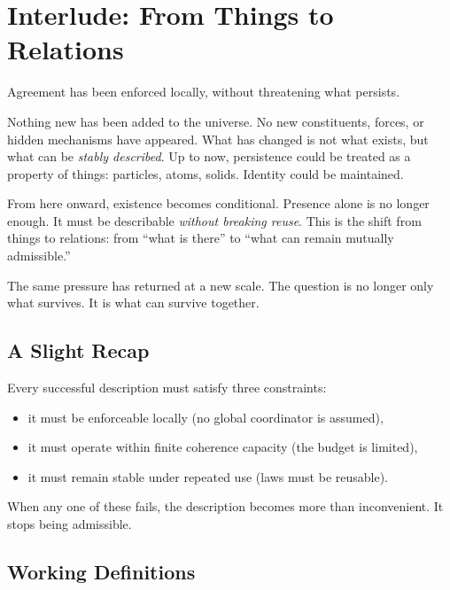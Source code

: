 \documentclass[11pt,twoside,openright]{book}
\begin{document}
\clearpage
{%
  \let\cleardoublepage\clearpage
\chapter{Interlude: From Things to Relations}
}
Agreement has been enforced locally,
without threatening what persists.

Nothing new has been added to the universe. No new constituents, forces, or hidden mechanisms have appeared. What has changed is not what exists, but what can be \emph{stably described}. Up to now, persistence could be treated as a property of things: particles, atoms, solids. Identity could be maintained.

From here onward, existence becomes conditional. Presence alone is no longer enough. It must be describable \emph{without breaking reuse}. This is the shift from things to relations: from ``what is there'' to ``what can remain mutually admissible.''

The same pressure has returned at a new scale.
The question is no longer only what survives.
It is what can survive together.

\section*{A Slight Recap}

Every successful description must satisfy three constraints:

\begin{itemize}
\item it must be enforceable locally (no global coordinator is assumed),
\item it must operate within finite coherence capacity (the budget is limited),
\item it must remain stable under repeated use (laws must be reusable).
\end{itemize}

When any one of these fails, the description becomes more than inconvenient. It stops being admissible.

\section*{Working Definitions}
\end{document}

